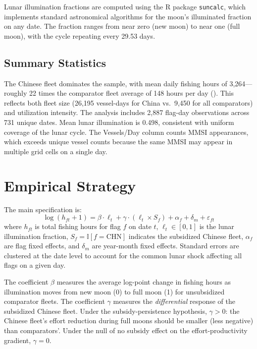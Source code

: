 \documentclass[12pt]{article}
\newcommand{\ind}{\mathbb{I}}
\begin{document}
Lunar illumination fractions are computed using the R package \texttt{suncalc}, which implements standard astronomical algorithms for the moon's illuminated fraction on any date. The fraction ranges from near zero (new moon) to near one (full moon), with the cycle repeating every 29.53 days.

\subsection{Summary Statistics}



The Chinese fleet dominates the sample, with mean daily fishing hours of 3,264---roughly 22 times the comparator fleet average of 148 hours per day (). This reflects both fleet size (26,195 vessel-days for China vs.\ 9,450 for all comparators) and utilization intensity. The analysis includes 2,887 flag-day observations across 731 unique dates. Mean lunar illumination is 0.498, consistent with uniform coverage of the lunar cycle. The Vessels/Day column counts MMSI appearances, which exceeds unique vessel counts because the same MMSI may appear in multiple grid cells on a single day.


\section{Empirical Strategy}
\label{sec:strategy}

The main specification is:
\begin{equation}
\log(h_{ft} + 1) = \beta \cdot \ell_t + \gamma \cdot (\ell_t \times S_f) + \alpha_f + \delta_m + \varepsilon_{ft}
\label{eq:main}
\end{equation}
where $h_{ft}$ is total fishing hours for flag $f$ on date $t$, $\ell_t \in [0,1]$ is the lunar illumination fraction, $S_f = \ind[f = \text{CHN}]$ indicates the subsidized Chinese fleet, $\alpha_f$ are flag fixed effects, and $\delta_m$ are year-month fixed effects. Standard errors are clustered at the date level to account for the common lunar shock affecting all flags on a given day.

The coefficient $\beta$ measures the average log-point change in fishing hours as illumination moves from new moon (0) to full moon (1) for unsubsidized comparator fleets. The coefficient $\gamma$ measures the \textit{differential} response of the subsidized Chinese fleet. Under the subsidy-persistence hypothesis, $\gamma > 0$: the Chinese fleet's effort reduction during full moons should be smaller (less negative) than comparators'. Under the null of no subsidy effect on the effort-productivity gradient, $\gamma = 0$.
\end{document}
